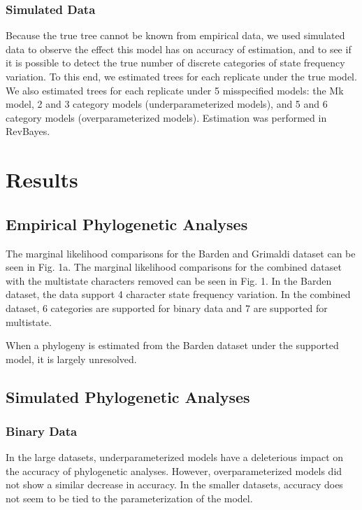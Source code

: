 \documentclass[]{article}
\begin{document}
\subsubsection{Simulated Data}

Because the true tree cannot be known from empirical data, we used simulated data to observe the effect this model has on accuracy of estimation, and to see if it is possible to detect the true number of discrete categories of state frequency variation.
To this end, we estimated trees for each replicate under the true model.
We also estimated trees for each replicate under 5 misspecified models: the Mk model, 2 and 3 category models (underparameterized models), and 5 and 6 category models (overparameterized models). 
Estimation was performed in RevBayes.\par


\section{Results}

\subsection{Empirical Phylogenetic Analyses}

The marginal likelihood comparisons for the Barden and Grimaldi dataset can be seen in Fig. 1a.
The marginal likelihood comparisons for the combined dataset with the multistate characters removed can be seen in Fig. 1.
In the Barden dataset, the data support 4 character state frequency variation.
In the combined dataset, 6 categories are supported for binary data and 7 are supported for multistate. \par
When a phylogeny is estimated from the Barden dataset under the supported model, it is largely unresolved. 


\subsection{Simulated Phylogenetic Analyses}
\subsubsection{Binary Data}

In the large datasets, underparameterized models have a deleterious impact on the accuracy of phylogenetic analyses. 
However, overparameterized models did not show a similar decrease in accuracy.
In the smaller datasets, accuracy does not seem to be tied to the parameterization of the model. \par
\end{document}
